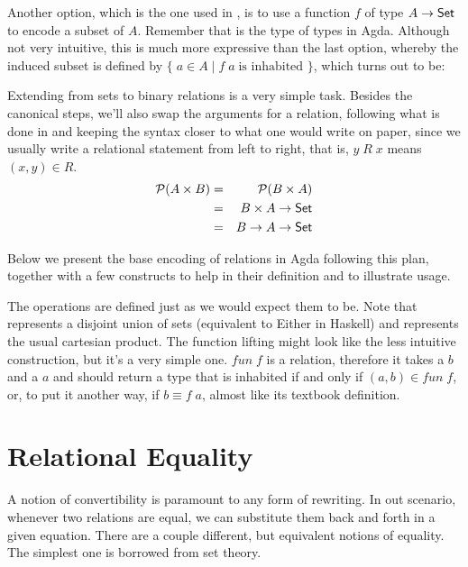 Another option, which is the one used in \cite{Jansson09}, is to use a function $f$
of type $A \rightarrow \D{Set}$ to encode a subset of $A$. Remember that  is
the type of types in Agda. Although not very intuitive, this is much more expressive than the 
last option, whereby the induced subset is defined by $\{\; a \in A\; |\; f\;a\;\text{is inhabited }\}$,
which turns out to be:


Extending from sets to binary relations is a very simple task. Besides the canonical steps,
we'll also swap the arguments for a relation, following what is done in \cite{Jansson09} and
keeping the syntax closer to what one would write on paper, since we usually write a relational
statement from left to right, that is, $y\;R\;x$ means $(x, y) \in R$.
\begin{eqnarray*}
  \powerset (A \times B) & = & \powerset (B \times A)\\
                         & = & B \times A \rightarrow \D{Set}\\
                         & = & B \rightarrow A \rightarrow \D{Set}
\end{eqnarray*}

Below we present the base encoding of relations in Agda following this plan, together with a few constructs
to help in their definition and to illustrate usage.


The operations are defined just as we would expect them to be. Note that  represents a disjoint union of sets
(equivalent to Either in Haskell) and  represents the usual cartesian product. The function
lifting might look like the less intuitive construction, but it's a very simple one. $\mathit{fun}\;f$ is a relation,
therefore it takes a $b$ and a $a$ and should return a type that is inhabited if and only if $(a, b) \in fun\;f$,
or, to put it another way, if $b \equiv f\;a$, almost like its textbook definition.

\section{Relational Equality}

A notion of convertibility is paramount to any form of rewriting. In out scenario, whenever
two relations are equal, we can substitute them back and forth in a given equation. There are
a couple different, but equivalent notions of equality. The simplest one is borrowed from set
theory.\\

